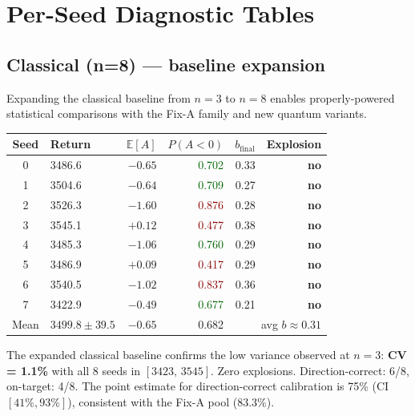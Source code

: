\documentclass[10pt,a4paper]{article}
\begin{document}
\section{Per-Seed Diagnostic Tables}

\subsection{Classical (n=8) — baseline expansion}
\label{sec:classical-n8}

Expanding the classical baseline from $n=3$ to $n=8$ enables properly-powered
statistical comparisons with the Fix-A family and new quantum variants.

\begin{center}
\setlength{\tabcolsep}{5pt}
\begin{tabular}{clrrrr}
\toprule
\textbf{Seed} & \textbf{Return} & $\mathbb{E}[A]$ &
  $P(A{<}0)$ & $b_\text{final}$ & Explosion \\
\midrule
0 & 3486.6 & $-0.65$ & \textcolor{darkgreen}{0.702} & 0.33 & \textbf{no} \\
1 & 3504.6 & $-0.64$ & \textcolor{darkgreen}{0.709} & 0.27 & \textbf{no} \\
2 & 3526.3 & $-1.60$ & \textcolor{darkred}{0.876} & 0.28 & \textbf{no} \\
3 & 3545.1 & $+0.12$ & \textcolor{darkred}{0.477} & 0.38 & \textbf{no} \\
4 & 3485.3 & $-1.06$ & \textcolor{darkgreen}{0.760} & 0.29 & \textbf{no} \\
5 & 3486.9 & $+0.09$ & \textcolor{darkred}{0.417} & 0.29 & \textbf{no} \\
6 & 3540.5 & $-1.02$ & \textcolor{darkred}{0.837} & 0.36 & \textbf{no} \\
7 & 3422.9 & $-0.49$ & \textcolor{darkgreen}{0.677} & 0.21 & \textbf{no} \\
\midrule
Mean & $3499.8 \pm 39.5$ & $-0.65$ & 0.682 &
  \multicolumn{2}{r}{avg $b \approx 0.31$} & 0/8 \\
\bottomrule
\end{tabular}
\end{center}

The expanded classical baseline confirms the low variance observed at $n=3$:
\textbf{CV = 1.1\%} with all 8 seeds in $[3423,\,3545]$. Zero explosions.
Direction-correct: 6/8, on-target: 4/8. The point estimate for direction-correct
calibration is 75\% (CI $[41\%,93\%]$), consistent with the Fix-A pool (83.3\%).
\end{document}
